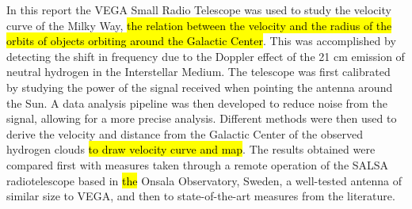 In this report the VEGA Small Radio Telescope was used to study the velocity curve of the Milky Way, \hl{the relation between the velocity and the radius of the orbits of objects orbiting around the Galactic Center}.
This was accomplished by detecting the shift in frequency due to the Doppler effect of the 21 cm emission of neutral hydrogen in the Interstellar Medium.
The telescope was first calibrated by studying the power of the signal received when pointing the antenna around the Sun.
A data analysis pipeline was then developed to {reduce} noise from the signal, {allowing for a more precise analysis}.
Different methods were then used to derive the velocity and distance from the Galactic Center of the observed hydrogen clouds \hl{to draw velocity curve and map}.
The results obtained were compared first with measures taken through a remote operation of the SALSA radiotelescope based in \hl{the} Onsala Observatory, Sweden, a well-tested antenna of similar size to VEGA, and then to state-of-the-art measures from the literature.


